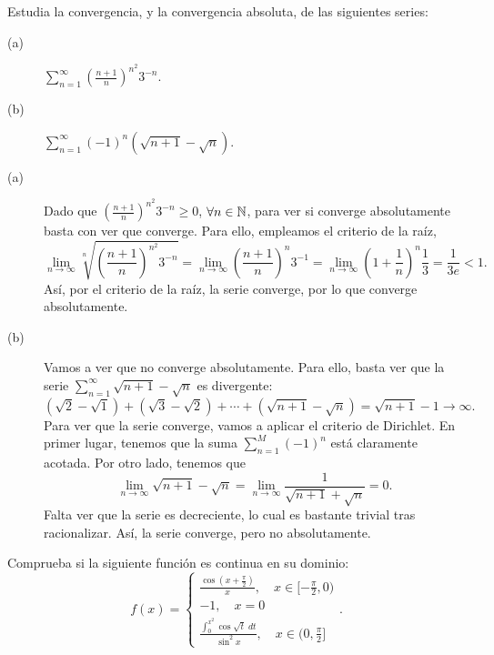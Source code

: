 \documentclass{article}
\begin{document}
\begin{ej}
Estudia la convergencia, y la convergencia absoluta, de las siguientes series:
\begin{description}
\item[(a)] $\displaystyle \sum^{\infty}_{n = 1}\left(\frac{n+1}{n}\right)^{n^{2}}3^{-n} $.
\item[(b)] $\displaystyle \sum^{\infty}_{n = 1}\left(-1\right)^{n}\left(\sqrt{n+1}-\sqrt{n}\right) $.
\end{description}
\end{ej}
\begin{sol}
\begin{description}
\item[(a)] Dado que $\displaystyle \left(\frac{n+1}{n}\right)^{n^{2}}3^{-n} \geq 0 $, $\displaystyle \forall n \in \mathbb{N} $, para ver si converge absolutamente basta con ver que converge. Para ello, empleamos el criterio de la raíz, 
	\[\lim_{n \to \infty}\sqrt[n]{\left(\frac{n+1}{n}\right)^{n^{2}}3^{-n}} = \lim_{n \to \infty}\left(\frac{n+1}{n}\right)^{n}3^{-1}=\lim_{n \to \infty}\left(1+\frac{1}{n}\right)^{n}\frac{1}{3}=\frac{1}{3e} < 1 .\]
Así, por el criterio de la raíz, la serie converge, por lo que converge absolutamente. 	
\item[(b)] Vamos a ver que no converge absolutamente. Para ello, basta ver que la serie $\displaystyle \sum^{\infty}_{n = 1}\sqrt{n+1}-\sqrt{n} $ es divergente:
	\[\left(\sqrt{2}-\sqrt{1}\right)+\left(\sqrt{3}-\sqrt{2}\right)+\cdots +\left(\sqrt{n+1}-\sqrt{n}\right)=\sqrt{n+1}-1 \to \infty .\]
Para ver que la serie converge, vamos a aplicar el criterio de Dirichlet. En primer lugar, tenemos que la suma $\displaystyle \sum^{M}_{n = 1}\left(-1\right)^{n} $ está claramente acotada. Por otro lado, tenemos que 
\[\lim_{n \to \infty}\sqrt{n+1}-\sqrt{n} = \lim_{n \to \infty}\frac{1}{\sqrt{n+1}+\sqrt{n}} = 0 .\]
Falta ver que la serie es decreciente, lo cual es bastante trivial tras racionalizar. Así, la serie converge, pero no absolutamente. 
\end{description}
\end{sol}
\begin{ej}
Comprueba si la siguiente función es continua en su dominio:
\[f\left(x\right) = 
\begin{cases}
\frac{\cos\left(x+\frac{\pi }{2}\right)}{x}, \quad x \in [-\frac{\pi }{2}, 0) \\
-1, \quad x = 0 \\
\frac{\int^{x^{2}}_{0} \cos \sqrt{t} \; dt}{\sin ^{2}x}, \quad x \in (0, \frac{\pi }{2}]
\end{cases}
.\]
\end{ej}
\end{document}
